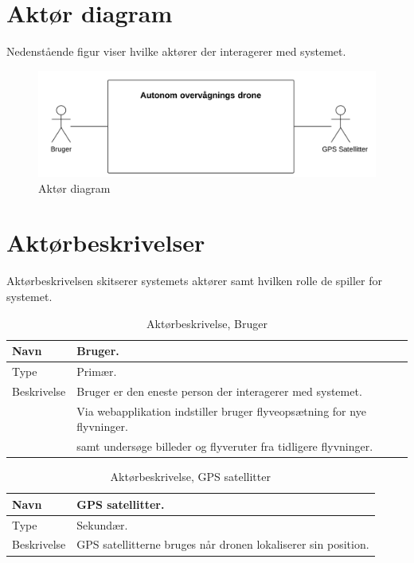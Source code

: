 \section{Aktør diagram}
Nedenstående figur viser hvilke aktører der interagerer med systemet.

\begin{figure}[H]
\centering
\includegraphics[width=1\textwidth]{Billeder/Aktor_diagram.png}
\caption{Aktør diagram}
\label{fig:ATD}
\end{figure}

\section{Aktørbeskrivelser}
Aktørbeskrivelsen skitserer systemets aktører samt hvilken rolle de spiller for systemet.


\begin{table}[H]
\begin{tabular}{|l|p{12.25cm}|} \hline

Navn					& Bruger. 	\\\hline
Type					& Primær.	\\\hline
Beskrivelse				& Bruger er den eneste person der interagerer med systemet.\\
						& Via webapplikation indstiller bruger flyveopsætning for nye flyvninger. \\ 
						& samt undersøge billeder og flyveruter fra tidligere flyvninger.\\\hline
						
\end{tabular}
\caption{Aktørbeskrivelse, Bruger}
\label{tab:AB1}
\end{table}


\begin{table}[H]
\begin{tabular}{|l|p{12.25cm}|}
\hline
Navn					& GPS satellitter. 	\\\hline
Type					& Sekundær.	\\\hline
Beskrivelse				& GPS satellitterne bruges når dronen lokaliserer sin position.\\\hline

\end{tabular}
\caption{Aktørbeskrivelse, GPS satellitter}
\label{tab:AB1}
\end{table}